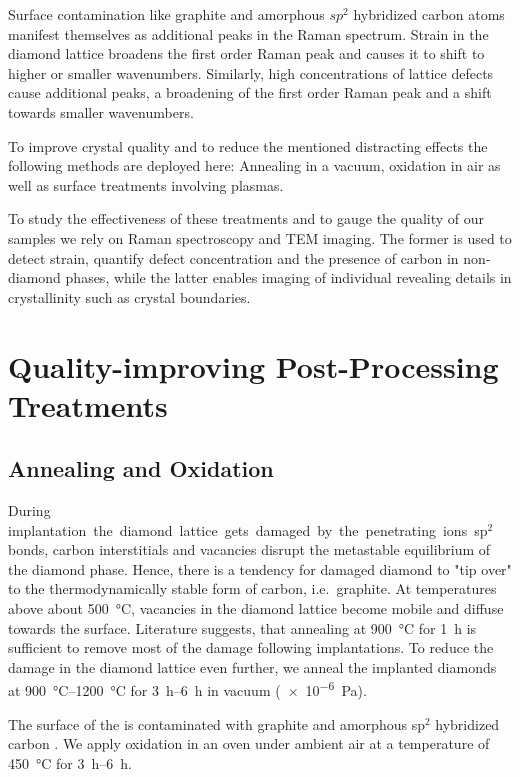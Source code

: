 		Surface contamination like graphite and amorphous $sp^2$ hybridized carbon atoms manifest themselves as additional peaks in the Raman spectrum.
		Strain in the diamond lattice broadens the first order Raman peak and causes it to shift to higher or smaller wavenumbers.
		Similarly, high concentrations of lattice defects cause additional peaks, a broadening of the first order Raman peak and a shift towards smaller wavenumbers.

		To improve crystal quality and to reduce the mentioned distracting effects the following methods are deployed here: Annealing in a vacuum, oxidation in air as well as surface treatments involving plasmas.

		To study the effectiveness of these treatments and to gauge the quality of our \nd samples we rely on Raman spectroscopy and TEM imaging. The former is used to detect strain, quantify defect concentration and the presence of carbon in non-diamond phases, while the latter enables imaging of individual \nds revealing details in crystallinity such as crystal boundaries.

		\section{Quality-improving Post-Processing Treatments}

			\subsection{Annealing and Oxidation}\label{subsection::ann_ox}

				During \si implantation the diamond lattice gets damaged by the penetrating ions.
				sp$^2$ bonds, carbon interstitials and vacancies disrupt the metastable equilibrium of the diamond phase. Hence, there is a tendency for damaged diamond to "tip over" to the thermodynamically stable form of carbon, i.e.\ graphite.
				At temperatures above about \SI{500}{\celsius}, vacancies in the diamond lattice become mobile and diffuse towards the surface\cite{Dresselhaus1992}.
				Literature suggests, that annealing at \SI{900}{\celsius} for \SI{1}{\hour} is sufficient to remove most of the damage following implantations.
				To reduce the damage in the diamond lattice even further, we anneal the implanted diamonds at \SIrange{900}{1200}{\celsius} for \SIrange{3}{6}{h} in vacuum (\SI{e-6}{Pa}).
				
				The surface of the \nds is contaminated with graphite and amorphous sp$^2$ hybridized carbon . We apply oxidation in an oven under ambient air at a temperature of \SI{450}{\celsius} for \SIrange{3}{6}{h}.

